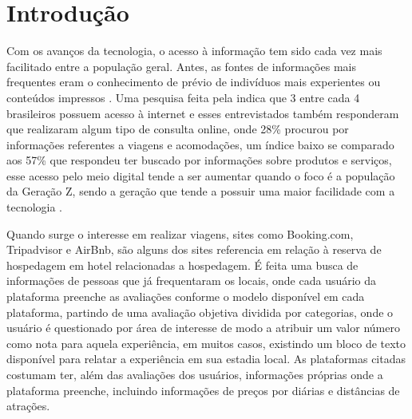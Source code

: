 
\chapter[Introdução]{Introdução}
\label{cap:intro}

\begin{comment}
Neste capítulo precisamos:
\begin{itemize}
    \item Introduzir o contexto
    \item Definir o que entendemos como avaliação de hotéis
    \item Apresentar em linhas gerais quais métodos são usados para detectar fake news, qual o estado da arte atual e quais são suas limitações.
    \item Descrever a nossa proposta e objetivos
    \item Descrever a estrutura do relatório.
\end{itemize}

\end{comment}

Com os avanços da tecnologia, o acesso à informação tem sido cada vez mais facilitado entre a população geral. Antes, as fontes de informações mais frequentes eram o conhecimento de prévio de indivíduos mais experientes ou conteúdos impressos \cite{jayathilake2021critical}. Uma pesquisa feita pela  indica que 3 entre cada 4 brasileiros possuem acesso à internet e esses entrevistados também responderam que realizaram algum tipo de consulta online, onde 28\% procurou por informações referentes a viagens e acomodações, um índice baixo se comparado aos 57\% que respondeu ter buscado por informações sobre produtos e serviços, esse acesso pelo meio digital tende a ser aumentar quando o foco é a população da Geração Z, sendo a geração que tende a possuir uma maior facilidade com a tecnologia \cite{sfodera2022technology}.

Quando surge o interesse em realizar viagens, sites como Booking.com, Tripadvisor e AirBnb, são alguns dos sites referencia em relação à reserva de hospedagem em hotel  relacionadas a hospedagem. É feita uma busca de informações de pessoas que já frequentaram os locais, onde cada usuário da plataforma preenche as avaliações conforme o modelo disponível em cada plataforma, partindo de uma avaliação objetiva dividida por categorias, onde o usuário é questionado por área de interesse de modo a atribuir um valor número como nota para aquela experiência, em muitos casos, existindo um bloco de texto disponível para relatar a experiência em sua estadia local. As plataformas citadas costumam ter, além das avaliações dos usuários, informações próprias onde a plataforma preenche, incluindo informações de preços por diárias e distâncias de atrações.

